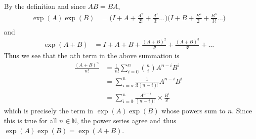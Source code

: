 \documentclass[12pt]{exam}
\theoremstyle{plain} %
\theoremstyle{definition} %
\theoremstyle{remark} %
\begin{document}
\begin{questions}
  \question
  \begin{solution}
    By the definition and since $AB = BA$,
    \begin{align*}
      \exp(A)\exp(B) &= \Big( I + A + \frac{A^2}{2!} +
      \frac{A^3}{3!} \ldots \Big)\Big( I + B + \frac{B^2}{2!} +
      \frac{B^3}{3!}\ldots \Big) \\
    \end{align*}
    and
    \begin{align*}
      \exp(A + B) &= I + A+B + \frac{(A+B)^2}{2!} +
      \frac{(A+B)^3}{3!} + \ldots
    \end{align*}
    Thus we see that the $n$th term in the above summation is
    \begin{align*}
      \frac{(A+B)^n}{n!} &= \frac{1}{n!} \sum_{i = 0}^{n} {n \choose
      i} A^{n-i}B^i \\
      &= \sum_{i = o}^{n} \frac{1}{i! (n-i)!} A^{n-i} B^i \\
      &= \sum_{i = 0}^{n} \frac{A^{n-i}}{(n-i)!} \times \frac{B^{i}}{i!}
    \end{align*}
    which is precisely the term in $\exp(A)\exp(B)$ whose powers sum
    to $n$. Since this is true for all $n \in \mathbb{N}$, the power
    series agree and thus $\exp(A)\exp(B) = \exp( A + B)$.
  \end{solution}


\end{questions}
\end{document}
